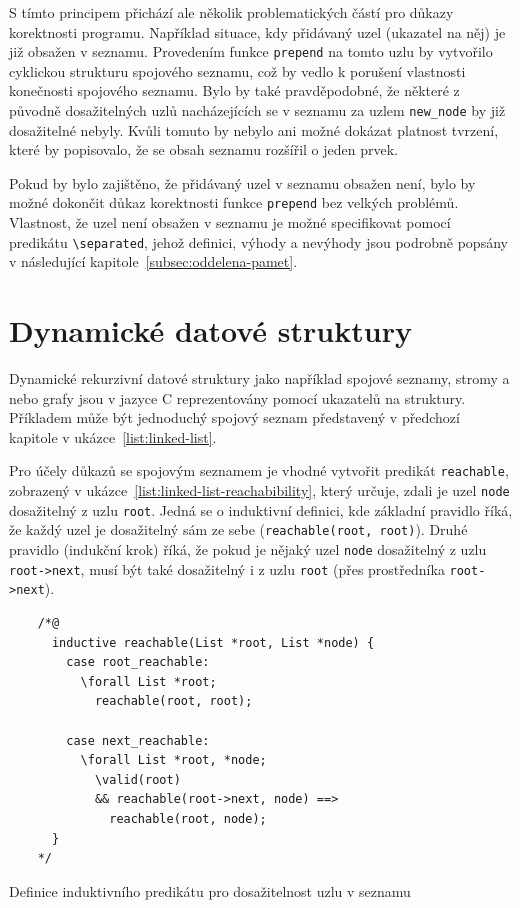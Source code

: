 S tímto principem přichází ale několik problematických částí pro důkazy korektnosti programu.
Například situace, kdy přidávaný uzel (ukazatel na něj) je již obsažen v seznamu.
Provedením funkce \texttt{prepend} na tomto uzlu
by vytvořilo cyklickou strukturu spojového seznamu,
což by vedlo k porušení vlastnosti konečnosti spojového seznamu.
Bylo by také pravděpodobné, že některé z původně dosažitelných uzlů
nacházejících se v seznamu za uzlem \texttt{new\_node}
by již dosažitelné nebyly.
Kvůli tomuto by nebylo ani možné dokázat platnost tvrzení,
které by popisovalo, že se obsah seznamu rozšířil o jeden prvek.


Pokud by bylo zajištěno, že přidávaný uzel v seznamu obsažen není,
bylo by možné dokončit důkaz korektnosti funkce \texttt{prepend} bez velkých problémů.
Vlastnost, že uzel není obsažen v seznamu je možné specifikovat pomocí predikátu \texttt{\textbackslash separated},
jehož definici, výhody a nevýhody jsou podrobně popsány v následující kapitole~\ref{subsec:oddelena-pamet}.


\section{Dynamické datové struktury}
\label{sec:dynamicke-datove-struktury}

Dynamické rekurzivní datové struktury jako například spojové seznamy,
stromy a nebo grafy jsou v jazyce C reprezentovány pomocí ukazatelů na struktury.
Příkladem může být jednoduchý spojový seznam představený v předchozí kapitole v ukázce~\ref{list:linked-list}.


Pro účely důkazů se spojovým seznamem je vhodné vytvořit predikát \texttt{reachable},
zobrazený v ukázce~\ref{list:linked-list-reachabibility},
který určuje, zdali je uzel \texttt{node} dosažitelný z uzlu \texttt{root}.
Jedná se o induktivní definici,
kde základní pravidlo říká,
že každý uzel je dosažitelný sám ze sebe (\texttt{reachable(root, root)}).
Druhé pravidlo (indukční krok) říká,
že pokud je nějaký uzel \texttt{node} dosažitelný z uzlu \texttt{root->next},
musí být také dosažitelný i z uzlu \texttt{root} (přes prostředníka \texttt{root->next}).

\begin{listing}[H]
    \begin{verbatim}
    /*@
      inductive reachable(List *root, List *node) {
        case root_reachable:
          \forall List *root;
            reachable(root, root);

        case next_reachable:
          \forall List *root, *node;
            \valid(root)
            && reachable(root->next, node) ==>
              reachable(root, node);
      }
    */
    \end{verbatim}
    \caption{Definice induktivního predikátu pro dosažitelnost uzlu v seznamu}
    \label{list:linked-list-reachabibility}
\end{listing}


